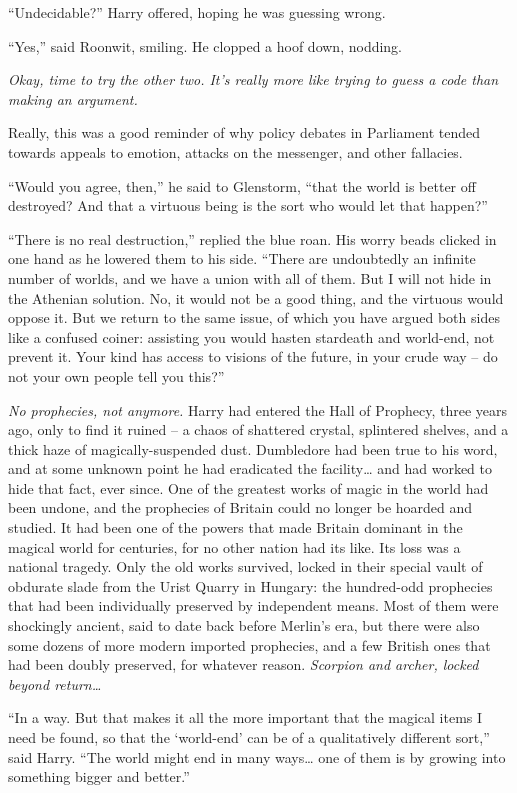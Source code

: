 ``Undecidable?'' Harry offered, hoping he was guessing wrong.

``Yes,'' said Roonwit, smiling. He clopped a hoof down, nodding.

\emph{Okay, time to try the other two. It's really more like trying to
guess a code than making an argument.}

Really, this was a good reminder of why policy debates in Parliament
tended towards appeals to emotion, attacks on the messenger, and other
fallacies.

``Would you agree, then,'' he said to Glenstorm, ``that the world is
better off destroyed? And that a virtuous being is the sort who would
let that happen?''

``There is no real destruction,'' replied the blue roan. His worry beads
clicked in one hand as he lowered them to his side. ``There are
undoubtedly an infinite number of worlds, and we have a union with all
of them. But I will not hide in the Athenian solution. No, it would not
be a good thing, and the virtuous would oppose it. But we return to the
same issue, of which you have argued both sides like a confused coiner:
assisting you would hasten stardeath and world-end, not prevent it. Your
kind has access to visions of the future, in your crude way -- do not
your own people tell you this?''

\emph{No prophecies, not anymore.} Harry had entered the Hall of
Prophecy, three years ago, only to find it ruined -- a chaos of
shattered crystal, splintered shelves, and a thick haze of
magically-suspended dust. Dumbledore had been true to his word, and at
some unknown point he had eradicated the facility\ldots{} and had worked
to hide that fact, ever since. One of the greatest works of magic in the
world had been undone, and the prophecies of Britain could no longer be
hoarded and studied. It had been one of the powers that made Britain
dominant in the magical world for centuries, for no other nation had its
like. Its loss was a national tragedy. Only the old works survived,
locked in their special vault of obdurate slade from the Urist Quarry in
Hungary: the hundred-odd prophecies that had been individually preserved
by independent means. Most of them were shockingly ancient, said to date
back before Merlin's era, but there were also some dozens of more modern
imported prophecies, and a few British ones that had been doubly
preserved, for whatever reason. \emph{Scorpion and archer, locked beyond
return\ldots{}}

``In a way. But that makes it all the more important that the magical
items I need be found, so that the `world-end' can be of a qualitatively
different sort,'' said Harry. ``The world might end in many ways\ldots{}
one of them is by growing into something bigger and better.''

